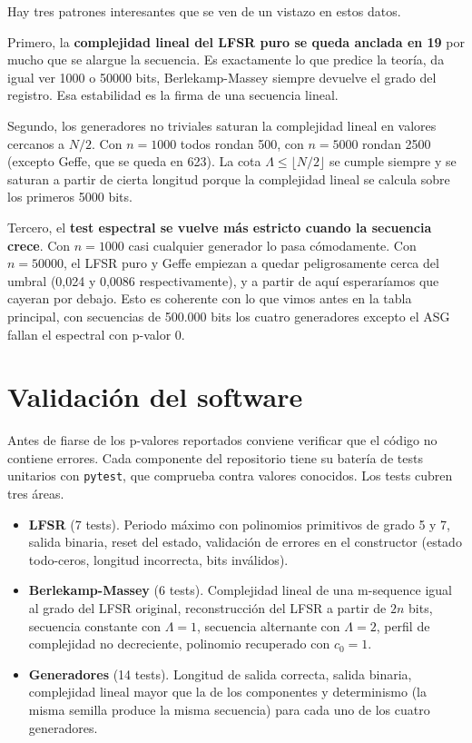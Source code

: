 Hay tres patrones interesantes que se ven de un vistazo en estos datos.

Primero, la \textbf{complejidad lineal del LFSR puro se queda anclada en 19} por mucho que se alargue la secuencia.
Es exactamente lo que predice la teoría, da igual ver 1000 o 50000 bits, Berlekamp-Massey siempre devuelve el grado del registro.
Esa estabilidad es la firma de una secuencia lineal.

Segundo, los generadores no triviales saturan la complejidad lineal en valores cercanos a $N/2$.
Con $n = 1000$ todos rondan 500, con $n = 5000$ rondan 2500 (excepto Geffe, que se queda en 623).
La cota $\Lambda \leq \lfloor N/2 \rfloor$ se cumple siempre y se saturan a partir de cierta longitud porque la complejidad lineal se calcula sobre los primeros 5000 bits.

Tercero, el \textbf{test espectral se vuelve más estricto cuando la secuencia crece}.
Con $n = 1000$ casi cualquier generador lo pasa cómodamente. Con $n = 50000$, el LFSR puro y Geffe
empiezan a quedar peligrosamente cerca del umbral (0,024 y 0,0086 respectivamente),
y a partir de aquí esperaríamos que cayeran por debajo. Esto es coherente con lo que vimos antes en la tabla principal,
con secuencias de 500.000 bits los cuatro generadores excepto el ASG fallan el espectral con p-valor 0.

\section{Validación del software}
\label{sec:validacion}

Antes de fiarse de los p-valores reportados conviene verificar que el código no contiene errores.
Cada componente del repositorio tiene su batería de tests unitarios con \texttt{pytest},
que comprueba contra valores conocidos. Los tests cubren tres áreas.

\begin{itemize}
  \item \textbf{LFSR} (7 tests). Periodo máximo con polinomios primitivos de grado 5 y 7,
        salida binaria, reset del estado, validación de errores en el constructor
        (estado todo-ceros, longitud incorrecta, bits inválidos).
  \item \textbf{Berlekamp-Massey} (6 tests). Complejidad lineal de una m-sequence igual al grado del LFSR original,
        reconstrucción del LFSR a partir de $2n$ bits, secuencia constante con $\Lambda = 1$,
        secuencia alternante con $\Lambda = 2$, perfil de complejidad no decreciente,
        polinomio recuperado con $c_0 = 1$.
  \item \textbf{Generadores} (14 tests). Longitud de salida correcta, salida binaria,
        complejidad lineal mayor que la de los componentes y determinismo
        (la misma semilla produce la misma secuencia) para cada uno de los cuatro generadores.
\end{itemize}

